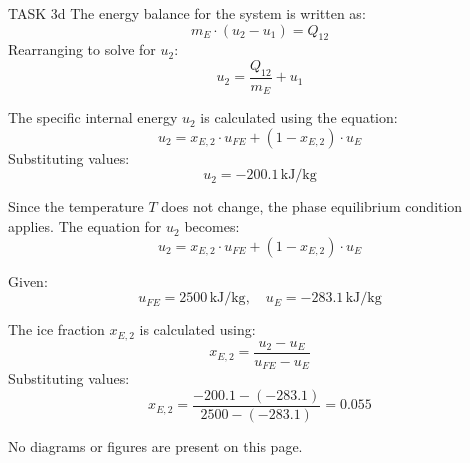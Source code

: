 TASK 3d  
The energy balance for the system is written as:  
\[
m_E \cdot (u_2 - u_1) = Q_{12}
\]  
Rearranging to solve for \( u_2 \):  
\[
u_2 = \frac{Q_{12}}{m_E} + u_1
\]  

The specific internal energy \( u_2 \) is calculated using the equation:  
\[
u_2 = x_{E,2} \cdot u_{FE} + (1 - x_{E,2}) \cdot u_{E}
\]  
Substituting values:  
\[
u_2 = -200.1 \, \text{kJ/kg}
\]  

Since the temperature \( T \) does not change, the phase equilibrium condition applies. The equation for \( u_2 \) becomes:  
\[
u_2 = x_{E,2} \cdot u_{FE} + (1 - x_{E,2}) \cdot u_{E}
\]  

Given:  
\[
u_{FE} = 2500 \, \text{kJ/kg}, \quad u_{E} = -283.1 \, \text{kJ/kg}
\]  

The ice fraction \( x_{E,2} \) is calculated using:  
\[
x_{E,2} = \frac{u_2 - u_{E}}{u_{FE} - u_{E}}
\]  
Substituting values:  
\[
x_{E,2} = \frac{-200.1 - (-283.1)}{2500 - (-283.1)} = 0.055
\]  

No diagrams or figures are present on this page.